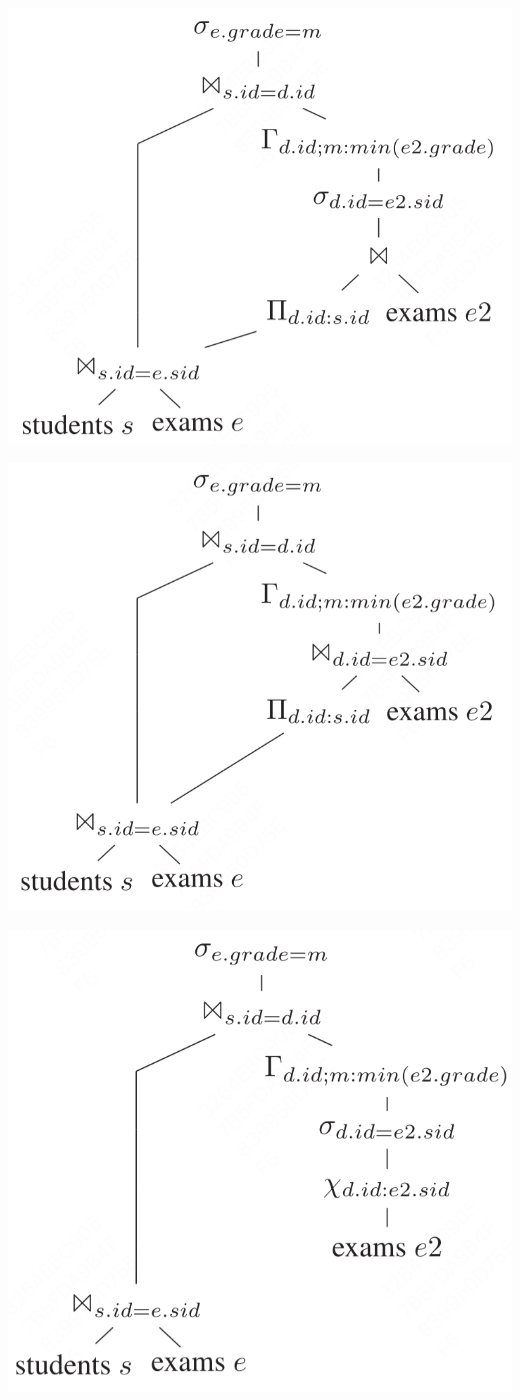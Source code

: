\documentclass[11pt]{article}
\begin{document}
\begin{center}
\includegraphics[width=.6\textwidth]{../../images/papers/90.png}
\end{center}

\begin{center}
\includegraphics[width=.6\textwidth]{../../images/papers/91.png}
\end{center}

\begin{center}
\includegraphics[width=.6\textwidth]{../../images/papers/92.png}
\end{center}
\end{document}
